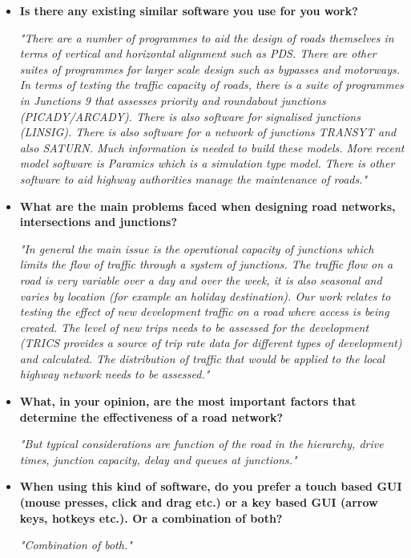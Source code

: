     \begin{itemize}
        \item \textbf{Is there any existing similar software you use for you work?}

        \emph{"There are a number of programmes to aid the design of roads themselves in terms of vertical and horizontal alignment such as PDS. There are other suites of programmes for larger scale design such as bypasses and motorways. In terms of testing the traffic capacity of roads, there is a suite of programmes in Junctions 9 that assesses priority and roundabout junctions (PICADY/ARCADY). There is also software for signalised junctions (LINSIG). There is also software for a network of junctions TRANSYT and also SATURN. Much information is needed to build these models. More recent model software is Paramics which is a simulation type model. There is other software to aid highway authorities manage the maintenance of roads."}

        \item \textbf{What are the main problems faced when designing road networks, intersections and junctions?}

        \emph{"In general the main issue is the operational capacity of junctions which limits the flow of traffic through a system of junctions. The traffic flow on a road is very variable over a day and over the week, it is also seasonal and varies by location (for example an holiday destination). Our work relates to testing the effect of new development traffic on a road where access is being created. The level of new trips needs to be assessed for the development (TRICS provides a source of trip rate data for different types of development) and calculated. The distribution of traffic that would be applied to the local highway network needs to be assessed."}

        \item \textbf{What, in your opinion, are the most important factors that determine the effectiveness of a road network?}

        \emph{"But typical considerations are function of the road in the hierarchy, drive times, junction capacity, delay and queues at junctions."}

        \item \textbf{When using this kind of software, do you prefer a touch based GUI (mouse presses, click and drag etc.) or a key based GUI (arrow keys, hotkeys etc.). Or a combination of both?}

        \emph{"Combination of both."}
    \end{itemize}

